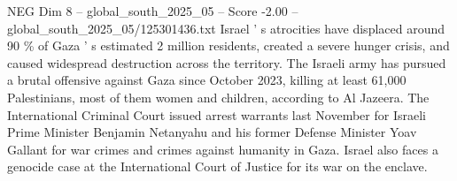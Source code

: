 \begin{textsample}{NEG Dim 8 – global\_south\_2025\_05 – Score -2.00 – global\_south\_2025\_05/125301436.txt}
Israel ' s atrocities have displaced around 90 \% of Gaza ' s estimated 2 million residents, created a severe hunger crisis, and caused widespread destruction across the territory.
The Israeli army has pursued a brutal offensive against Gaza since October 2023, killing at least 61,000 Palestinians, most of them women and children, according to Al Jazeera.
The International Criminal Court issued arrest warrants last November for Israeli Prime Minister Benjamin Netanyahu and his former Defense Minister Yoav Gallant for war crimes and crimes against humanity in Gaza.
Israel also faces a genocide case at the International Court of Justice for its war on the enclave.

\end{textsample}

